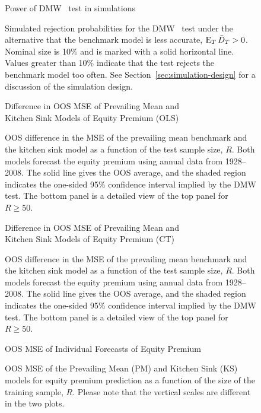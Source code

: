 \documentclass[12pt]{article}
\begin{document}
\begin{figure}\centering
  {\large Power of DMW \oost\ test in simulations}
  \caption{Simulated rejection probabilities for the DMW \oost\ test
    under the alternative that the benchmark model is less accurate,
    $\operatorname{E}_T \bar{D}_{T} > 0$. Nominal size is 10\% and is marked with a solid
    horizontal line. Values greater than 10\% indicate that the test
    rejects the benchmark model too often. See
    Section~\ref{sec:simulation-design} for a discussion of the
    simulation design.}
  \label{fig:ttest-power}
\end{figure}
\clearpage

\begin{figure}
\centering
\large{Difference in OOS MSE of Prevailing Mean and\\ Kitchen
    Sink Models of Equity Premium (OLS)}
\caption{OOS difference in the MSE
  of the prevailing mean benchmark and the kitchen sink model as a
  function of the test sample size, $R$.  Both models forecast the
  equity premium using annual data from 1928--2008.  The solid line
  gives the OOS average, and the shaded region indicates the
  one-sided 95\% confidence interval implied by the
  DMW test.  The bottom panel is a detailed view of the top
  panel for $R \geq 50$.}
\label{fig:empirics1}
\end{figure}
\clearpage

\begin{figure}
\centering
\large{Difference in OOS MSE of Prevailing Mean and\\ Kitchen
    Sink Models of Equity Premium (CT)}
\caption{OOS difference in the MSE
  of the prevailing mean benchmark and the kitchen sink model as a
  function of the test sample size, $R$.  Both models forecast the
  equity premium using annual data from 1928--2008.  The solid line
  gives the OOS average, and the shaded region indicates the
  one-sided 95\% confidence interval implied by the 
  DMW test.  The bottom panel is a detailed view of the top
  panel for $R \geq 50$.}
\label{fig:empirics2}
\end{figure}
\clearpage

\begin{figure}
\centering
\large{OOS MSE of Individual Forecasts of Equity Premium}
\caption{OOS MSE of the Prevailing Mean (PM) and
    Kitchen Sink (KS) models for equity premium prediction as
    a function of the size of the training sample, $R$.  Please note
    that the vertical scales are different in the two plots.}
\label{fig:empirics3}
\end{figure}
\end{document}
